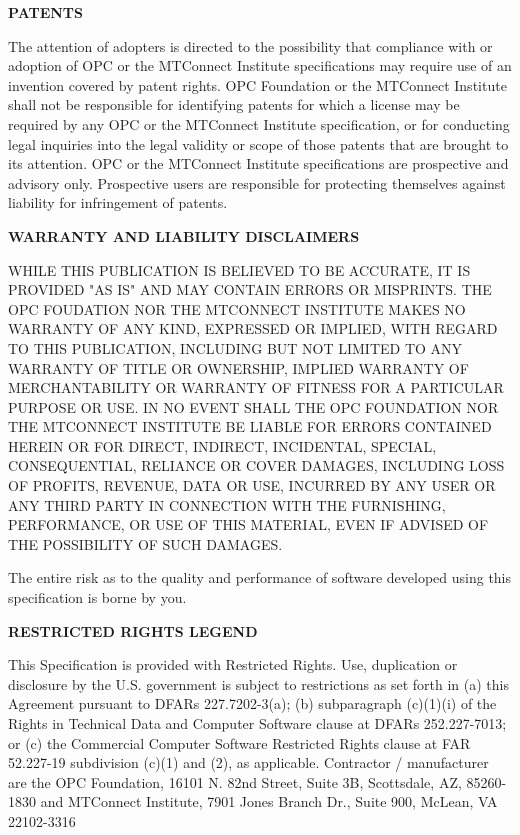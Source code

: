 \textbf{PATENTS} 

The attention of adopters is directed to the possibility that compliance with or adoption of OPC or the MTConnect Institute specifications may require use of an invention covered by patent rights. OPC Foundation or the MTConnect Institute shall not be responsible for identifying patents for which a license may be required by any OPC or the MTConnect Institute specification, or for conducting legal inquiries into the legal validity or scope of those patents that are brought to its attention. OPC or the MTConnect Institute specifications are prospective and advisory only. Prospective users are responsible for protecting themselves against liability for infringement of patents.

\textbf{WARRANTY AND LIABILITY DISCLAIMERS}

WHILE THIS PUBLICATION IS BELIEVED TO BE ACCURATE, IT IS PROVIDED "AS IS" AND MAY CONTAIN ERRORS OR MISPRINTS. THE OPC FOUDATION NOR THE MTCONNECT INSTITUTE MAKES NO WARRANTY OF ANY KIND, EXPRESSED OR IMPLIED, WITH REGARD TO THIS PUBLICATION, INCLUDING BUT NOT LIMITED TO ANY WARRANTY OF TITLE OR OWNERSHIP, IMPLIED WARRANTY OF MERCHANTABILITY OR WARRANTY OF FITNESS FOR A PARTICULAR PURPOSE OR USE. IN NO EVENT SHALL THE OPC FOUNDATION NOR THE MTCONNECT INSTITUTE BE LIABLE FOR ERRORS CONTAINED HEREIN OR FOR DIRECT, INDIRECT, INCIDENTAL, SPECIAL, CONSEQUENTIAL, RELIANCE OR COVER DAMAGES, INCLUDING LOSS OF PROFITS, REVENUE, DATA OR USE, INCURRED BY ANY USER OR ANY THIRD PARTY IN CONNECTION WITH THE FURNISHING, PERFORMANCE, OR USE OF THIS MATERIAL, EVEN IF ADVISED OF THE POSSIBILITY OF SUCH DAMAGES.

The entire risk as to the quality and performance of software developed using this specification is borne by you. 

\textbf{RESTRICTED RIGHTS LEGEND}

This Specification is provided with Restricted Rights. Use, duplication or disclosure by the U.S. government is subject to restrictions as set forth in (a) this Agreement pursuant to DFARs 227.7202-3(a); (b) subparagraph (c)(1)(i) of the Rights in Technical Data and Computer Software clause at DFARs 252.227-7013; or (c) the Commercial Computer Software Restricted Rights clause at FAR 52.227-19 subdivision (c)(1) and (2), as applicable. Contractor / manufacturer are the OPC Foundation, 16101 N. 82nd Street, Suite 3B, Scottsdale, AZ, 85260-1830 and MTConnect Institute, 7901 Jones Branch Dr., Suite 900, McLean, VA 22102-3316


